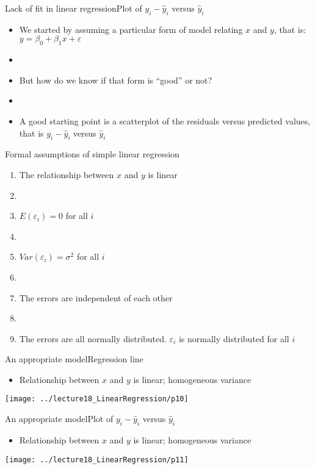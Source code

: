 \documentclass[xcolor=dvipsnames]{beamer}
\begin{document}
\begin{frame}{Lack of fit in linear regression}{Plot of $y_i - \hat{y}_i$ versus $\hat{y}_i$}
	\begin{itemize}
		\item We started by assuming a particular form of model relating $x$ and $y$, that is: $y = \beta_0 + \beta_1 x + \varepsilon$
		\item[]
		\item But how do we know if that form is ``good'' or not?
		\item[]
		\item A good starting point is a scatterplot of the residuals versus predicted values, that is $y_i - \hat{y}_i$ versus $\hat{y}_i$
	\end{itemize}
\end{frame}

\begin{frame}{Formal assumptions of simple linear regression}
\begin{enumerate}
	\item The relationship between $x$ and $y$ is linear
	\item[]
	\item $E(\varepsilon_i) = 0$ for all $i$
	\item[]
	\item $Var(\varepsilon_i) = \sigma^2$ for all $i$
	\item[]
	\item The errors are independent of each other
	\item[]
	\item The errors are all normally distributed. $\varepsilon_i$ is normally distributed for all $i$
\end{enumerate}
\end{frame}

\begin{frame}{An appropriate model}{Regression line}
\begin{itemize}
	\item Relationship between $x$ and $y$ is linear; homogeneous variance
\end{itemize}
	\begin{center}
		\texttt{[image: ../lecture18\_LinearRegression/p10]}
	\end{center}
\end{frame}

\begin{frame}{An appropriate model}{Plot of $y_i - \hat{y}_i$ versus $\hat{y}_i$}
\begin{itemize}
	\item Relationship between $x$ and $y$ is linear; homogeneous variance
\end{itemize}
\begin{center}
	\texttt{[image: ../lecture18\_LinearRegression/p11]}
\end{center}
\end{frame}
\end{document}
